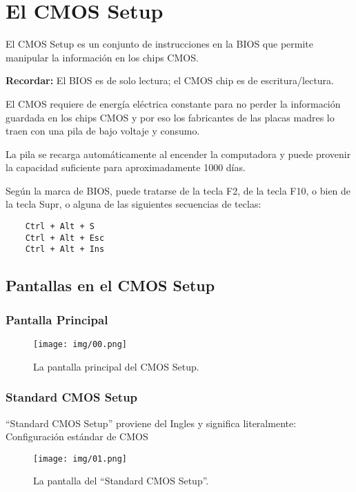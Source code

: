 \documentclass[12pt,oneside,a4paper]{article}
\begin{document}
	\newpage
	\newpage
\section{El CMOS Setup}{\label{sec:cmossetup}}

	El CMOS Setup es un conjunto de instrucciones en la BIOS que permite
	manipular la información en los chips CMOS.

	{\bf Recordar:} El BIOS es de solo lectura; el CMOS chip es de escritura/lectura.

	El CMOS requiere de energía eléctrica constante para no perder la
	información guardada en los chips CMOS y por eso los fabricantes de las
	placas madres lo traen con una pila de bajo voltaje y consumo.

	La pila se recarga automáticamente al encender la computadora y puede
	provenir la capacidad suficiente para aproximadamente 1000 días.

	Según la marca de BIOS, puede tratarse de la tecla F2, de la tecla F10, o
	bien de la tecla Supr, o alguna de las siguientes secuencias de teclas: 

	\begin{verbatim}
	Ctrl + Alt + S 
	Ctrl + Alt + Esc 
	Ctrl + Alt + Ins 
	\end{verbatim}

	\newpage
	\subsection{Pantallas en el CMOS Setup}{\label{sub:pantallas en el cmos setup}}

		\subsubsection{Pantalla Principal}{\label{sub:pantalla principal}}
			
			\begin{figure}[H]
				\centering
					\texttt{[image: img/00.png]}
				\caption{La pantalla principal del CMOS Setup.}
			\end{figure}

		\subsubsection{Standard CMOS Setup}{\label{sub:Standard cmos setup}}
	
			``Standard CMOS Setup'' proviene del Ingles y significa literalmente:
			Configuración estándar de CMOS
			\begin{figure}[H]
				\centering
					\texttt{[image: img/01.png]}
				\caption{La pantalla del ``Standard CMOS Setup''.}
			\end{figure}
			
\end{document}
